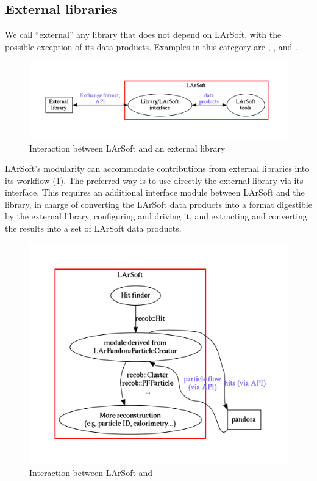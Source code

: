\subsection{External libraries}\label{external-libraries}

We call ``external'' any library that does not depend on LArSoft, with
the possible exception of its data products. Examples in this category
are \GENIE, \GEANT, and \Pandora.

\begin{figure}[htbp]
\centering
\includegraphics[width=\textwidth]{figures/LArSoftAndExternals.pdf}
\caption{\label{fig:LArSoftAndExternals}Interaction between LArSoft and
an external library}
\end{figure}

LArSoft's modularity can accommodate contributions from external
libraries into its workflow (\cref{fig:LArSoftAndExternals}). The
preferred way is to use directly the external library via its interface.
This requires an additional interface module between LArSoft and the
library, in charge of converting the LArSoft data products into a format
digestible by the external library, configuring and driving it, and
extracting and converting the results into a set of LArSoft data
products.

\begin{figure}[htbp]
\centering
\includegraphics[width=\textwidth]{figures/LArSoftAndPandora.pdf}
\caption{\label{fig:LArSoftAndPandora}Interaction between LArSoft and
\Pandora}
\end{figure}

